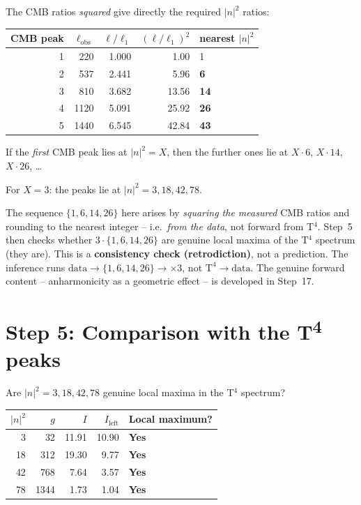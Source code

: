 The CMB ratios \emph{squared} give directly the required
$|n|^2$ ratios:

\begin{center}
\begin{tabular}{rrrrl}
\toprule
CMB peak & $\ell_\mathrm{obs}$ & $\ell/\ell_1$ & $(\ell/\ell_1)^2$ & nearest $|n|^2$ \\
\midrule
1 & 220  & 1{.}000 & 1{.}00  & 1 \\
2 & 537  & 2{.}441 & 5{.}96  & \textbf{6} \\
3 & 810  & 3{.}682 & 13{.}56 & \textbf{14} \\
4 & 1120 & 5{.}091 & 25{.}92 & \textbf{26} \\
5 & 1440 & 6{.}545 & 42{.}84 & \textbf{43} \\
\bottomrule
\end{tabular}
\end{center}

If the \emph{first} CMB peak lies at $|n|^2 = X$, then the
further ones lie at $X \cdot 6$, $X \cdot 14$, $X \cdot 26$, \ldots

For $X = 3$: the peaks lie at $|n|^2 = 3, 18, 42, 78$.

\begin{tcolorbox}[colback=red!4!white, colframe=red!55!black,
  title={Honest reading of Step~4 (direction of inference)}]
The sequence $\{1,6,14,26\}$ here arises by \emph{squaring the measured} CMB
ratios and rounding to the nearest integer -- i.e.\ \emph{from the data}, not
forward from T$^4$. Step~5 then checks whether $3\cdot\{1,6,14,26\}$ are
genuine local maxima of the T$^4$ spectrum (they are). This is a
\textbf{consistency check (retrodiction)}, not a prediction. The inference
runs $\text{data}\to\{1,6,14,26\}\to{\times3}$, not $\text{T}^4\to\text{data}$.
The genuine forward content -- anharmonicity as a geometric effect -- is
developed in Step~17.
\end{tcolorbox}

\section{Step 5: Comparison with the T\textsuperscript{4} peaks}

Are $|n|^2 = 3, 18, 42, 78$ genuine local maxima in the T$^4$ spectrum?

\begin{center}
\begin{tabular}{rrrrl}
\toprule
$|n|^2$ & $g$ & $I$ & $I_\mathrm{left}$ & Local maximum? \\
\midrule
3  & 32   & 11{.}91 & 10{.}90 & \textbf{Yes} \\
18 & 312  & 19{.}30 & 9{.}77  & \textbf{Yes} \\
42 & 768  & 7{.}64  & 3{.}57  & \textbf{Yes} \\
78 & 1344 & 1{.}73  & 1{.}04  & \textbf{Yes} \\
\bottomrule
\end{tabular}
\end{center}

